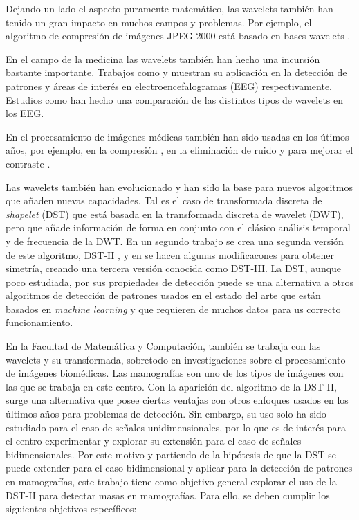 Dejando un lado el aspecto puramente matemático, las wavelets también han tenido un gran impacto  
en muchos campos y problemas. Por ejemplo, el algoritmo de compresión de imágenes JPEG 2000 está basado en
bases wavelets \cite{Taubman2002}.

En el campo de la medicina las wavelets también han hecho una incursión bastante importante. Trabajos como
\cite{Bhattacharyya2018} y \cite{Sharma2020} muestran su aplicación en la detección de patrones y áreas de interés
en electroencefalogramas (EEG) respectivamente. Estudios como \cite{Too2018} han hecho una comparación de las distintos
tipos de wavelets en los EEG. 

En el procesamiento de imágenes médicas también han sido 
usadas en los útimos años, por ejemplo, en la compresión \cite{Bruylants2015}\cite{Alkinani2021}, en la eliminación de ruido
 \cite{Wang2006}\cite{George2016}\cite{Patil2021} y para 
mejorar el contraste \cite{Dikshit2022}.

Las wavelets también han evolucionado y han sido la base para nuevos algoritmos que añaden nuevas capacidades.
Tal es el caso de transformada discreta de \textit{shapelet} (DST) \cite{Guido2008} que está basada en la transformada discreta
de wavelet (DWT), pero que añade información de forma en conjunto con el clásico análisis temporal y de frecuencia de la
DWT. En un segundo trabajo se crea una segunda versión de este algoritmo, DST-II \cite{Guido2018}, y en \cite{Guido2021} se hacen 
algunas modificacones para obtener simetría, creando una tercera versión conocida como DST-III.
La DST, aunque poco estudiada, por sus propiedades de detección puede se una alternativa a otros algoritmos de
detección de patrones usados en el estado del arte que están basados en \textit{machine learning} y que requieren
de muchos datos para us correcto funcionamiento.

En la Facultad de Matemática y Computación, también se trabaja con las wavelets y su transformada, sobretodo en
investigaciones sobre el procesamiento de imágenes biomédicas. Las mamografías son uno de los tipos de imágenes
con las que se trabaja en este centro. 
Con la aparición del algoritmo de la DST-II, surge  
una alternativa que posee ciertas ventajas con otros enfoques  
usados en los últimos años para problemas de detección. Sin embargo, su uso solo ha sido estudiado para el 
caso de señales unidimensionales, por lo que es de interés para el centro experimentar y explorar su extensión
para el caso de señales bidimensionales. Por este motivo y partiendo de la hipótesis de que la DST se 
puede extender para el caso bidimensional y aplicar para la detección de patrones en mamografías, este trabajo tiene como 
objetivo general explorar el uso de la DST-II para detectar masas en mamografías. Para ello, se deben cumplir los 
siguientes objetivos específicos:

